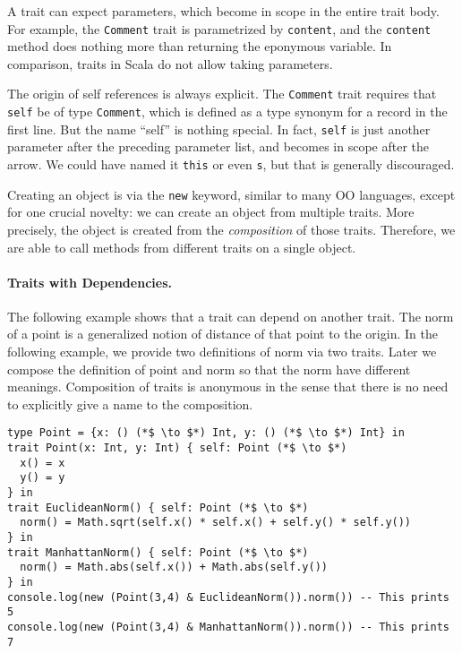 A trait can expect parameters, which become in scope in the entire trait body.
For example, the \lstinline$Comment$ trait is parametrized by
\lstinline$content$, and the \lstinline$content$ method does nothing more than
returning the eponymous variable. In comparison, traits in Scala do not allow
taking parameters.

The origin of self references is always explicit. The \lstinline$Comment$ trait
requires that \lstinline$self$ be of type \lstinline$Comment$, which is defined
as a type synonym for a record in the first line. But the name ``self'' is
nothing special. In fact, \lstinline$self$ is just another parameter after the
preceding parameter list, and becomes in scope after the arrow. We could have
named it \lstinline$this$ or even \lstinline$s$, but that is generally
discouraged.

Creating an object is via the \lstinline$new$ keyword, similar to many OO
languages, except for one crucial novelty: we can create an object from multiple
traits. More precisely, the object is created from the \emph{composition} of
those traits. Therefore, we are able to call methods from different traits on a
single object.

\paragraph{Traits with Dependencies.} The following example shows that a trait
can depend on another trait. The norm of a point is a generalized notion of
distance of that point to the origin. In the following example, we provide two
definitions of norm via two traits. Later we compose the definition of point and
norm so that the norm have different meanings. Composition of traits is
anonymous in the sense that there is no need to explicitly give a name to the
composition.

\begin{lstlisting}
type Point = {x: () (*$ \to $*) Int, y: () (*$ \to $*) Int} in
trait Point(x: Int, y: Int) { self: Point (*$ \to $*)
  x() = x
  y() = y
} in
trait EuclideanNorm() { self: Point (*$ \to $*)
  norm() = Math.sqrt(self.x() * self.x() + self.y() * self.y())
} in
trait ManhattanNorm() { self: Point (*$ \to $*)
  norm() = Math.abs(self.x()) + Math.abs(self.y())
} in
console.log(new (Point(3,4) & EuclideanNorm()).norm()) -- This prints 5
console.log(new (Point(3,4) & ManhattanNorm()).norm()) -- This prints 7
\end{lstlisting}

